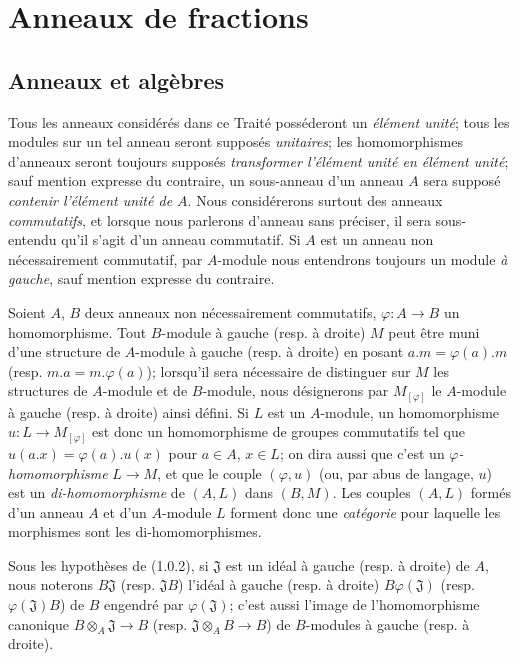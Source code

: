 \section{Anneaux de fractions}
\label{section:0.1-fr}

\setcounter{subsection}{-1}
\subsection{Anneaux et algèbres}
\label{subsection:0.1.0-fr}

\begin{env}[1.0.1]
\label{0.1.0.1-fr}
Tous les anneaux considérés dans ce Traité posséderont un \emph{élément unité};
tous les modules sur un tel anneau seront supposés \emph{unitaires}; les homomorphismes d'anneaux seront toujours supposés \emph{transformer l'élément unité en élément unité}; sauf mention expresse du contraire, un sous-anneau d'un anneau $A$ sera supposé \emph{contenir l'élément unité de $A$}.
Nous considérerons surtout des anneaux \emph{commutatifs}, et lorsque nous parlerons d'anneau sans préciser, il sera sous-entendu qu'il s'agit d'un anneau commutatif.
Si $A$ est un anneau non nécessairement commutatif, par $A$-module nous entendrons toujours un module \emph{à gauche}, sauf mention expresse du contraire.
\end{env}

\begin{env}[1.0.2]
\label{0.1.0.2-fr}
Soient $A$, $B$ deux anneaux non nécessairement commutatifs, $\varphi:A\to B$ un homomorphisme.
Tout $B$-module à gauche (resp. à droite) $M$ peut être muni d'une structure de $A$-module à gauche (resp. à droite) en posant $a.m=\varphi(a).m$ (resp. $m.a=m.\varphi(a)$); lorsqu'il sera nécessaire de distinguer sur $M$ les structures de $A$-module et de $B$-module, nous désignerons par $M_{[\varphi]}$ le $A$-module à gauche (resp. à droite) ainsi défini.
Si $L$ est un $A$-module, un homomorphisme $u:L\to M_{[\varphi]}$ est donc un homomorphisme de groupes commutatifs tel que $u(a.x)=\varphi(a).u(x)$ pour $a\in A$, $x\in L$; on dira aussi que c'est un \emph{$\varphi$-homomorphisme} $L\to M$, et que le couple $(\varphi,u)$ (ou, par abus de langage, $u$) est un \emph{di-homomorphisme} de $(A,L)$ dans $(B,M)$.
Les couples $(A,L)$ formés d'un anneau $A$ et d'un $A$-module $L$ forment donc une \emph{catégorie} pour laquelle les morphismes sont les di-homomorphismes.
\end{env}

\begin{env}[1.0.3]
\label{0.1.0.3-fr}
Sous les hypothèses de (1.0.2), si $\mathfrak{J}$ est un idéal à gauche (resp. à droite) de $A$, nous noterons $B\mathfrak{J}$ (resp. $\mathfrak{J}B$) l'idéal à gauche (resp. à droite) $B\varphi(\mathfrak{J})$ (resp. $\varphi(\mathfrak{J})B$) de $B$ engendré par $\varphi(\mathfrak{J})$; c'est aussi l'image de l'homomorphisme canonique $B\otimes_A\mathfrak{J}\to B$ (resp. $\mathfrak{J}\otimes_A B\to B$) de $B$-modules à gauche (resp. à droite).
\end{env}

